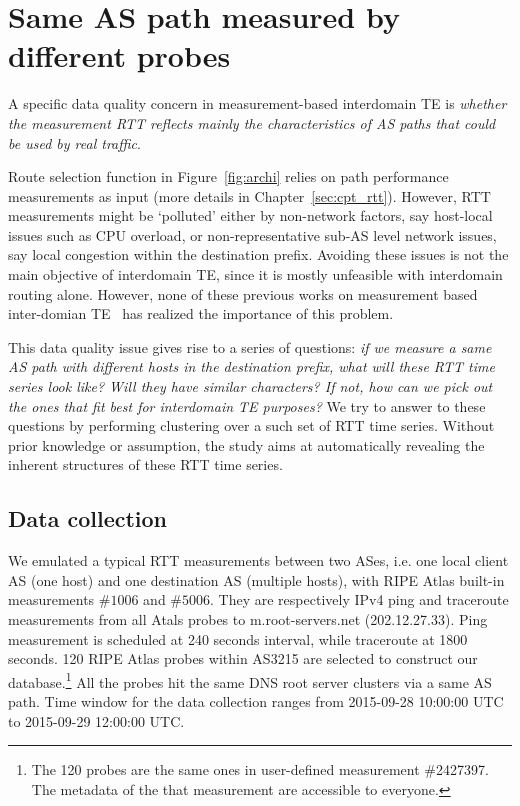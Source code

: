 \section{Same AS path measured by different probes}
A specific data quality concern in measurement-based interdomain TE is \textit{whether the measurement RTT reflects mainly the characteristics of AS paths that could be used by real traffic}.

Route selection function in Figure~\ref{fig:archi} relies on path performance measurements as input (more details in Chapter~\ref{sec:cpt_rtt}).
However, RTT measurements might be `polluted' either by non-network factors, say host-local issues such as CPU overload, or non-representative sub-AS level network issues, say local congestion within the destination prefix.
Avoiding these issues is not the main objective of interdomain TE, since it is mostly unfeasible with interdomain routing alone.
However, none of these previous works on measurement based inter-domian TE~\cite{Goldenberg2004, Akella2008} has realized the importance of this problem.

This data quality issue gives rise to a series of questions: \textit{if we measure a same AS path with different hosts in the destination prefix, what will these RTT time series look like? Will they have similar characters? If not, how can we pick out the ones that fit best for interdomain TE purposes?}
We try to answer to these questions by performing clustering over a such set of RTT time series.
Without prior knowledge or assumption, the study aims at automatically revealing the inherent structures of these RTT time series.

\subsection{Data collection}
We emulated a typical RTT measurements between two ASes, i.e. one local client AS (one host) and one destination AS (multiple hosts), with RIPE Atlas built-in measurements $\#1006$ and $\#5006$.
They are respectively IPv4 ping and traceroute measurements from all Atals probes to m.root-servers.net (202.12.27.33). 
Ping measurement is scheduled at 240 seconds interval, while traceroute at 1800 seconds.
120 RIPE Atlas probes within AS3215 are selected to construct our database.\footnote{The 120 probes are the same ones in user-defined measurement \#2427397. The metadata of the that measurement are accessible to everyone.}
All the probes hit the same DNS root server clusters via a same AS path.
Time window for the data collection ranges from 2015-09-28 10:00:00 UTC to 2015-09-29 12:00:00 UTC.

